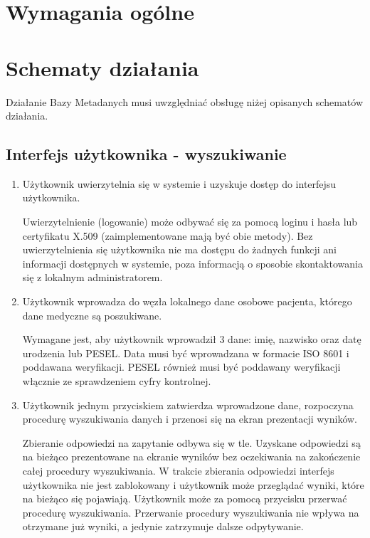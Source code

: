 \documentclass[a4paper]{report}
\begin{document}
\section{Wymagania ogólne}

\section{Schematy działania}

Działanie Bazy Metadanych musi uwzględniać obsługę niżej opisanych schematów działania.

\subsection{Interfejs użytkownika - wyszukiwanie}
\begin{enumerate}
  \item Użytkownik uwierzytelnia się w systemie i uzyskuje dostęp do interfejsu użytkownika.

    Uwierzytelnienie (logowanie) może odbywać się za pomocą loginu i hasła lub certyfikatu X.509 
    (zaimplementowane mają być obie metody). Bez uwierzytelnienia się użytkownika nie ma dostępu do
    żadnych funkcji ani informacji dostępnych w systemie, poza informacją o sposobie skontaktowania
    się z lokalnym administratorem.

  \item Użytkownik wprowadza do węzła lokalnego dane osobowe pacjenta, którego dane medyczne są poszukiwane.

        Wymagane jest, aby użytkownik wprowadził 3 dane: imię, nazwisko oraz datę urodzenia lub PESEL.
        Data musi być wprowadzana w formacie ISO 8601 i poddawana weryfikacji. PESEL również musi być
        poddawany weryfikacji włącznie ze sprawdzeniem cyfry kontrolnej.
  
  \item Użytkownik jednym przyciskiem zatwierdza wprowadzone dane, rozpoczyna procedurę wyszukiwania danych i przenosi się na ekran prezentacji wyników.

        Zbieranie odpowiedzi na zapytanie odbywa się w tle. Uzyskane odpowiedzi są na bieżąco prezentowane na ekranie wyników bez oczekiwania na zakończenie całej procedury wyszukiwania. W trakcie zbierania odpowiedzi interfejs użytkownika nie jest zablokowany i użytkownik może przeglądać wyniki, które na bieżąco się pojawiają. Użytkownik może za pomocą przycisku przerwać procedurę wyszukiwania. Przerwanie procedury wyszukiwania nie wpływa na otrzymane już wyniki, a jedynie zatrzymuje dalsze odpytywanie.
  
\end{enumerate}
\end{document}
